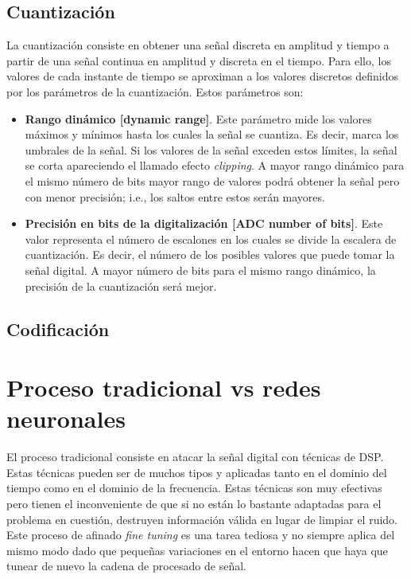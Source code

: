 \subsection{Cuantización}
La cuantización consiste en obtener una señal discreta en amplitud y tiempo a partir de una señal continua en amplitud y discreta en el tiempo. Para ello, los valores de cada instante de tiempo se aproximan a los valores discretos definidos por los parámetros de la cuantización. Estos parámetros son:
\begin{itemize}
	\item \textbf{Rango dinámico [dynamic range]}. Este parámetro mide los valores máximos y mínimos hasta los cuales la señal se cuantiza. Es decir, marca los umbrales de la señal. Si los valores de la señal exceden estos límites, la señal se corta apareciendo el llamado efecto \textit{clipping}. A mayor rango dinámico para el mismo número de bits mayor rango de valores podrá obtener la señal pero con menor precisión; i.e., los saltos entre estos serán mayores.
	\item \textbf{Precisión en bits de la digitalización [\gls{ADC} number of bits]}. Este valor representa el número de escalones en los cuales se divide la escalera de cuantización. Es decir, el número de los posibles valores que puede tomar la señal digital. A mayor número de bits para el mismo rango dinámico, la precisión de la cuantización será mejor.
\end{itemize}

\subsection{Codificación}

\section{Proceso tradicional vs redes neuronales}
El proceso tradicional consiste en atacar la señal digital con técnicas de \gls{DSP}. Estas técnicas pueden ser de muchos tipos y aplicadas tanto en el dominio del tiempo como en el dominio de la frecuencia. Estas técnicas son muy efectivas pero tienen el inconveniente de que si no están lo bastante adaptadas para el problema en cuestión, destruyen información válida en lugar de limpiar el ruido. Este proceso de afinado \textit{fine tuning} es una tarea tediosa y no siempre aplica del mismo modo dado que pequeñas variaciones en el entorno hacen que haya que tunear de nuevo la cadena de procesado de señal.

